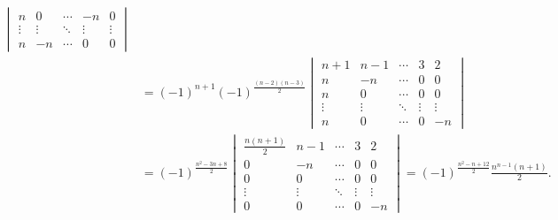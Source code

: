 \documentclass[UTF8,12pt,a4paper,fontset=fandol]{ctexart}
\begin{document}
\begin{solve}
\begin{enumerate}
\begin{enumerate}
\begin{align*}
\begin{vmatrix}
                                                       n      & 0      & \cdots & -n     & 0      \\
                                                       \vdots & \vdots & \ddots & \vdots & \vdots \\
                                                       n      & -n     & \cdots & 0      & 0
                                                   \end{vmatrix}                                   \\
                                      & =(-1)^{n+1}(-1)^{\frac{(n-2)(n-3)}{2}}
                                    \begin{vmatrix}
                                        n+1    & n-1    & \cdots & 3      & 2      \\
                                        n      & -n     & \cdots & 0      & 0      \\
                                        n      & 0      & \cdots & 0      & 0      \\
                                        \vdots & \vdots & \ddots & \vdots & \vdots \\
                                        n      & 0      & \cdots & 0      & -n
                                    \end{vmatrix}                                                  \\
                                      & =(-1)^{\frac{n^2-3n+8}{2}}\begin{vmatrix}
                                                                      \frac{n(n+1)}{2} & n-1    & \cdots & 3      & 2      \\
                                                                      0                & -n     & \cdots & 0      & 0      \\
                                                                      0                & 0      & \cdots & 0      & 0      \\
                                                                      \vdots           & \vdots & \ddots & \vdots & \vdots \\
                                                                      0                & 0      & \cdots & 0      & -n
                                                                  \end{vmatrix}=(-1)^{\frac{n^2-n+12}{2}}\frac{n^{n-1}(n+1)}{2}.
                                \end{align*}


\end{enumerate}
\end{enumerate}
\end{solve}
\end{document}
